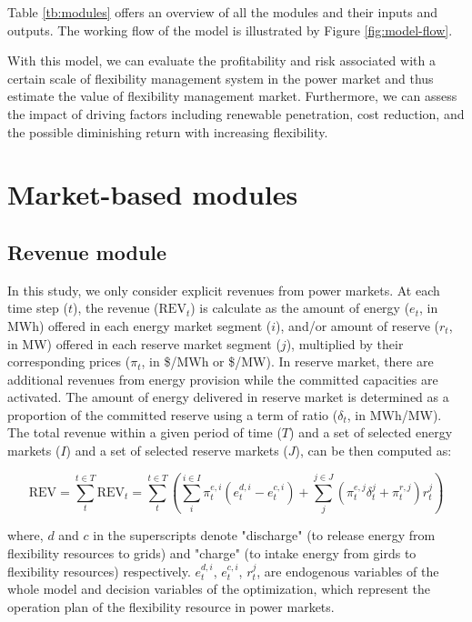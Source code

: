 Table \ref{tb:modules} offers an overview of all the modules and their inputs and outputs. The working flow of the model is illustrated by Figure \ref{fig:model-flow}.

With this model, we can evaluate the profitability and risk associated with a certain scale of flexibility management system in the power market and thus estimate the value of flexibility management market. Furthermore, we can assess the impact of driving factors including renewable penetration, cost reduction, and the possible diminishing return with increasing flexibility.

\section{Market-based modules}

\subsection{Revenue module}
\label{sec:revenue}
In this study, we only consider explicit revenues from power markets. At each time step ($t$), the revenue ($\text{REV}_t$) is calculate as the amount of energy ($e_t$, in MWh) offered in each energy market segment ($i$), and/or amount of reserve ($r_t$, in MW) offered in each reserve market segment ($j$), multiplied by their corresponding prices ($\pi_t$, in \$/MWh or \$/MW). In reserve market, there are additional revenues from energy provision while the committed capacities are activated. The amount of energy delivered in reserve market is determined as a proportion of the committed reserve using a term of ratio ($\delta_t$, in MWh/MW). The total revenue within a given period of time ($T$) and a set of selected energy markets ($I$) and a set of  selected reserve markets ($J$), can be then computed as:

\begin{equation}
\label{eq:module-revenue}
\text{REV}=  \sum_{t}^{t \in T} \text{REV}_t = \sum_{t}^{t \in T} \left( \sum_{i}^{i \in I}  \pi_t^{e,i} (e_t^{d,i} - e_t^{c,i})  + \sum_{j}^{j \in J} (\pi_t^{e,j} \delta_t^{j} + \pi_t^{r,j}) r_t^j \right)
\end{equation}

where, $d$ and $c$ in the superscripts denote "discharge" (to release energy from flexibility resources to grids) and "charge" (to intake energy from girds to flexibility resources) respectively.  $e_t^{d,i}$, $e_t^{c,i}$, $r_t^{j}$, are endogenous variables of the whole model and decision variables of the optimization, which represent the operation plan of the flexibility resource in power markets.

